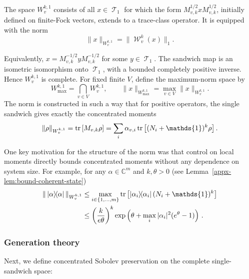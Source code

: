 \documentclass[11pt]{article}
\theoremstyle{myplain}
\theoremstyle{mydefinition}
\theoremstyle{remark}
\DeclareMathOperator{\cT}{\mathcal{T}}
\DeclareMathOperator{\cW}{\mathcal{W}}
\DeclareMathOperator{\1}{\mathds{1}}
\newcommand{\ketbra}[2]{\left\vert#1\right\rangle\!\! \left\langle#2\right\vert}
\newcommand{\tr}[1][]{\operatorname{tr}%
  \ifx#1\empty \else \left[ #1 \right] \fi}
\begin{document}
        The space $W_v^{k,1}$ consists of all $x\in\cT_1$ for which the form $M_{v,k}^{1/2}xM_{v,k}^{1/2}$, initially defined on finite-Fock vectors, extends to a trace-class operator. It is equipped with the norm
        \begin{equation*}
            \|x\|_{W^{k,1}_v} = \| \cW_v^{k}(x) \|_1.
        \end{equation*}
        
        Equivalently, $x=M_{v,k}^{-1/2}yM_{v,k}^{-1/2}$ for some $y\in\cT_1$. The sandwich map is an isometric isomorphism onto $\cT_1$, with a bounded completely positive inverse. Hence $W_v^{k,1}$ is complete. For fixed finite $V$, define the maximum-norm space by
        \begin{equation*}
            W_{\max}^{k,1}=\bigcap_{v\in V}W_v^{k,1},\qquad
            \|x\|_{W_{\max}^{k,1}}
            =\max_{v\in V}\|x\|_{W_v^{k,1}}.
        \end{equation*}
        The norm is constructed in such a way that for positive operators, the single sandwich gives exactly the concentrated moments
        \begin{equation}\label{eq:positive-concentrated-moment}
            \|\rho\|_{W_v^{k,1}}
            =\tr[M_{v,k}\rho]
            =\sum_i\alpha_{v,i}\tr[(N_i+\1)^k\rho].
        \end{equation}
        

        One key motivation for the structure of the norm was that control on local moments directly bounds concentrated moments without any dependence on system size. For example, for any $\alpha\in\mathbb{C}^m$ and $k,\theta>0$ (see Lemma~\ref{appx-lem:bound-coherent-state})
        \begin{align*}
            \|\ketbra{\alpha}{\alpha}\|_{W^{k,1}_v}
            &\leq\max_{i\in\{1,...,m\}}\tr[\ketbra{\alpha_i}{\alpha_i}(N_i+\1)^k]\\
            &\leq\left(\frac{k}{e\theta}\right)^k
            \exp\left(\theta+\max_i|\alpha_i|^2(e^\theta-1)\right)\,.
        \end{align*}

        \subsubsection{Generation theory}

        Next, we define concentrated Sobolev preservation on the complete single-sandwich space:
        
\end{document}
